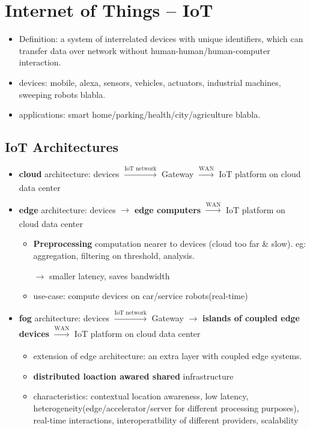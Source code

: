 \section{Internet of Things -- IoT}
\begin{itemize}
	\item Definition: a system of interrelated devices with unique identifiers, which can transfer data over network without human-human/human-computer interaction.
	\item devices: mobile, alexa, sensors, vehicles, actuators, industrial machines, sweeping robots blabla.
	\item applications: smart home/parking/health/city/agriculture blabla.
	
	 
\end{itemize}

\subsection{IoT Architectures}

\begin{itemize}
	\item \textbf{cloud} architecture: devices $\xrightarrow[]{\text{IoT network}}$ Gateway $\xrightarrow[]{\text{WAN}}$ IoT platform on cloud data center
	
	
	\item \textbf{edge} architecture: devices $\rightarrow$ \textbf{edge computers} $\xrightarrow[]{\text{WAN}}$ IoT platform on cloud data center
	\begin{itemize}
		
		\item \textbf{Preprocessing} computation nearer to devices (cloud too far \& slow). eg: aggregation, filtering on threshold, analysis. 
		
		$\rightarrow$ smaller latency, saves bandwidth
		\item use-case: compute devices on car/service robots(real-time)
	\end{itemize}
	
	\item \textbf{fog} architecture: devices $\xrightarrow[]{\text{IoT network}}$ Gateway $\rightarrow$ \textbf{islands of coupled edge devices} $\xrightarrow[]{\text{WAN}}$ IoT platform on cloud data center
	\begin{itemize}
		\item extension of edge architecture: an extra layer with coupled edge systems.
		\item \textbf{distributed loaction awared shared} infrastructure
		\item characteristics: contextual location awareness, low latency, heterogeneity(edge/accelerator/server for different processing purposes), real-time interactions, interoperatbility of different providers, scalability
	\end{itemize}
\end{itemize}

